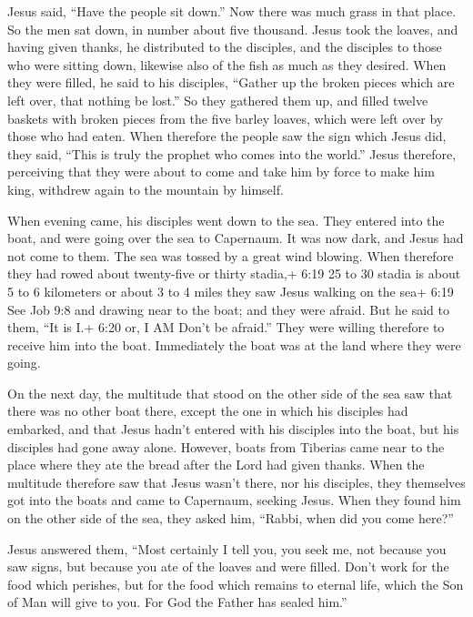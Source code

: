  Jesus said, ``Have the people sit down.'' Now there was
much grass in that place. So the men sat down, in number about five
thousand.  Jesus took the loaves, and having given thanks,
he distributed to the disciples, and the disciples to those who were
sitting down, likewise also of the fish as much as they desired.
 When they were filled, he said to his disciples, ``Gather
up the broken pieces which are left over, that nothing be lost.''
 So they gathered them up, and filled twelve baskets with
broken pieces from the five barley loaves, which were left over by those
who had eaten.  When therefore the people saw the sign
which Jesus did, they said, ``This is truly the prophet who comes into
the world.''  Jesus therefore, perceiving that they were
about to come and take him by force to make him king, withdrew again to
the mountain by himself.

 When evening came, his disciples went down to the sea.
 They entered into the boat, and were going over the sea to
Capernaum. It was now dark, and Jesus had not come to them.
 The sea was tossed by a great wind blowing. 
When therefore they had rowed about twenty-five or thirty stadia,+ 6:19
25 to 30 stadia is about 5 to 6 kilometers or about 3 to 4 miles they
saw Jesus walking on the sea+ 6:19 See Job 9:8 and drawing near to the
boat; and they were afraid.  But he said to them, ``It is
I.+ 6:20 or, I AM Don't be afraid.''  They were willing
therefore to receive him into the boat. Immediately the boat was at the
land where they were going.

 On the next day, the multitude that stood on the other
side of the sea saw that there was no other boat there, except the one
in which his disciples had embarked, and that Jesus hadn't entered with
his disciples into the boat, but his disciples had gone away alone.
 However, boats from Tiberias came near to the place where
they ate the bread after the Lord had given thanks.  When
the multitude therefore saw that Jesus wasn't there, nor his disciples,
they themselves got into the boats and came to Capernaum, seeking Jesus.
 When they found him on the other side of the sea, they
asked him, ``Rabbi, when did you come here?''

 Jesus answered them, ``Most certainly I tell you, you seek
me, not because you saw signs, but because you ate of the loaves and
were filled.  Don't work for the food which perishes, but
for the food which remains to eternal life, which the Son of Man will
give to you. For God the Father has sealed him.''

